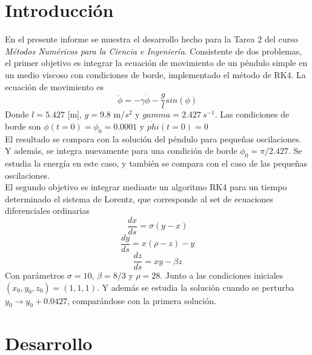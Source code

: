 \documentclass[letterpaper,oneside]{article}
\begin{document}
	
\templatePortrait

\templatePagecfg





\templateFinalcfg


\section{Introducción}
En el presente informe se muestra el desarrollo hecho para la Tarea 2 del curso \textit{Métodos Numéricos para la Ciencia e Ingeniería}. Consistente de dos problemas, el primer objetivo es integrar la ecuación de movimiento de un péndulo simple en un medio viscoso con condiciones de borde, implementado el método de RK4. La ecuación de movimiento es 
$$\ddot{\phi}=-\gamma \dot{\phi}- \frac{g}{l} sin(\phi)   $$
Donde $l=5.427$ [m], $g=9.8$ m/$s^2$ y $gamma=2.427~s^{-1}$. Las condiciones de borde son $\phi(t=0)=\phi_0=0.0001$ y $\dot{phi}(t=0)=0$ 
\\
El resultado se compara con la solución del péndulo para pequeñas oscilaciones. Y además, se integra nuevamente para una condición de borde $\phi_0=\pi/2.427$. Se estudia la energía en este caso, y también se compara con el caso de las pequeñas oscilaciones.
\\
El segundo objetivo es integrar mediante un algoritmo RK4 para un tiempo determinado el sistema de Lorentz, que corresponde al set de ecuaciones diferenciales ordinarias
$$\frac{dx}{ds}=\sigma (y-x) $$
$$\frac{dy}{ds}=x(\rho-z)-y$$
$$\frac{dz}{ds}=xy-\beta z $$
Con parámetros $\sigma = 10$, $\beta = 8/3$ y $\rho = 28$. Junto a las condiciones iniciales $(x_0,y_0,z_0)=(1,1,1)$. Y además se estudia la solución cuando se perturba $y_0\rightarrow y_0+0.0427$, comparándose con la primera solución.

\newpage
\section{Desarrollo}
\end{document}
